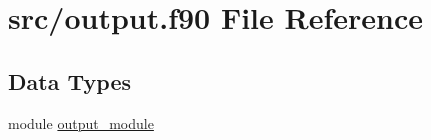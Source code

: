 \hypertarget{output_8f90}{\section{src/output.f90 File Reference}
\label{output_8f90}
}
\subsection*{Data Types}
\begin{DoxyCompactItemize}
\item 
module \hyperlink{classoutput__module}{output\-\_\-module}
\end{DoxyCompactItemize}
